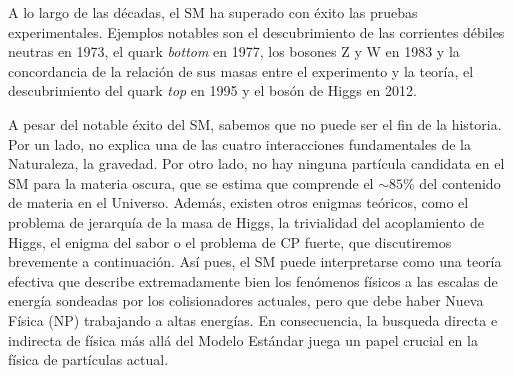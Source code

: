 A lo largo de las décadas, el SM ha superado con éxito las pruebas experimentales. Ejemplos notables son el descubrimiento de las corrientes débiles neutras en 1973, el quark \textit{bottom} en 1977, los bosones Z y W en 1983 y la concordancia de la relación de sus masas entre el experimento y la teoría, el descubrimiento del quark \textit{top} en 1995 y el bosón de Higgs en 2012. 

A pesar del notable éxito del SM, sabemos que no puede ser el fin de la historia. Por un lado, no explica una de las cuatro interacciones fundamentales de la Naturaleza, la gravedad. Por otro lado, no hay ninguna partícula candidata en el SM para la materia oscura, que se estima que comprende el $\sim85\%$ del contenido de materia en el Universo. Además, existen otros enigmas teóricos, como el problema de jerarquía de la masa de Higgs, la trivialidad del acoplamiento de Higgs, el enigma del sabor o el problema de CP fuerte, que discutiremos brevemente a continuación. Así pues, el SM puede interpretarse como una teoría efectiva que describe extremadamente bien los fenómenos físicos a las escalas de energía sondeadas por los colisionadores actuales, pero que debe haber Nueva Física (NP) trabajando a altas energías. En consecuencia, la busqueda directa e indirecta de física más allá del Modelo Estándar juega un papel crucial en la física de partículas actual.


